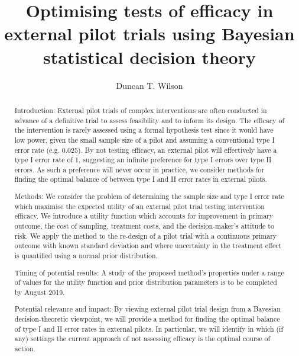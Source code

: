 \documentclass[sagev]{sagej}
\begin{document}

\title{Optimising tests of efficacy in external pilot trials using Bayesian statistical decision theory}

\author{Duncan T. Wilson}%



\begin{abstract}

Introduction: External pilot trials of complex interventions are often conducted in advance of a definitive trial to assess feasibility and to inform its design. The efficacy of the intervention is rarely assessed using a formal hypothesis test since it would have low power, given the small sample size of a pilot and assuming a conventional type I error rate (e.g. 0.025). By not testing efficacy, an external pilot will effectively have a type I error rate of 1, suggesting an infinite preference for type I errors over type II errors. As such a preference will never occur in practice, we consider methods for finding the optimal balance of between type I and II error rates in external pilots.

Methods: We consider the problem of determining the sample size and type I error rate which maximise the expected utility of an external pilot trial testing intervention efficacy. We introduce a utility function which accounts for improvement in primary outcome, the cost of sampling, treatment costs, and the decision-maker’s attitude to risk. We apply the method to the re-design of a pilot trial with a continuous primary outcome with known standard deviation and where uncertainty in the treatment effect is quantified using a normal prior distribution. 

Timing of potential results: A study of the proposed method’s properties under a range of values for the utility function and prior distribution parameters is to be completed by August 2019.

Potential relevance and impact: By viewing external pilot trial design from a Bayesian decision-theoretic viewpoint, we will provide a method for finding the optimal balance of type I and II error rates in external pilots. In particular, we will identify in which (if any) settings the current approach of not assessing efficacy is the optimal course of action. 
\end{abstract}
\end{document}
